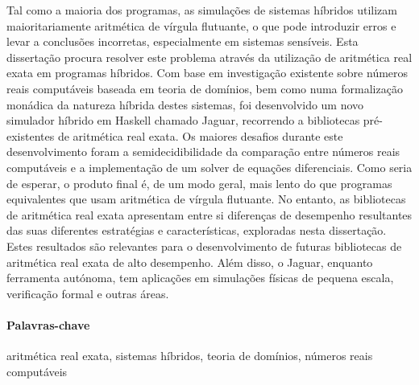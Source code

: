 Tal como a maioria dos programas, as simulações de sistemas híbridos utilizam maioritariamente aritmética de vírgula flutuante, o que pode introduzir erros e levar a conclusões incorretas, especialmente em sistemas sensíveis. Esta dissertação procura resolver este problema através da utilização de aritmética real exata em programas híbridos. Com base em investigação existente sobre números reais computáveis baseada em teoria de domínios, bem como numa formalização monádica da natureza híbrida destes sistemas, foi desenvolvido um novo simulador híbrido em Haskell chamado Jaguar, recorrendo a bibliotecas pré-existentes de aritmética real exata. Os maiores desafios durante este desenvolvimento foram a semidecidibilidade da comparação entre números reais computáveis e a implementação de um solver de equações diferenciais. Como seria de esperar, o produto final é, de um modo geral, mais lento do que programas equivalentes que usam aritmética de vírgula flutuante. No entanto, as bibliotecas de aritmética real exata apresentam entre si diferenças de desempenho resultantes das suas diferentes estratégias e características, exploradas nesta dissertação. Estes resultados são relevantes para o desenvolvimento de futuras bibliotecas de aritmética real exata de alto desempenho. Além disso, o Jaguar, enquanto ferramenta autónoma, tem aplicações em simulações físicas de pequena escala, verificação formal e outras áreas.

\paragraph{Palavras-chave} aritmética real exata, sistemas híbridos, teoria de domínios, números reais computáveis

\cleardoublepage
